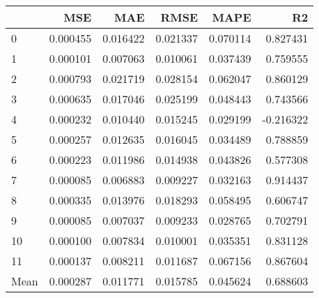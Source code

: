 \begin{tabular}{lrrrrr}
\toprule
 & MSE & MAE & RMSE & MAPE & R2 \\
\midrule
0 & 0.000455 & 0.016422 & 0.021337 & 0.070114 & 0.827431 \\
1 & 0.000101 & 0.007063 & 0.010061 & 0.037439 & 0.759555 \\
2 & 0.000793 & 0.021719 & 0.028154 & 0.062047 & 0.860129 \\
3 & 0.000635 & 0.017046 & 0.025199 & 0.048443 & 0.743566 \\
4 & 0.000232 & 0.010440 & 0.015245 & 0.029199 & -0.216322 \\
5 & 0.000257 & 0.012635 & 0.016045 & 0.034489 & 0.788859 \\
6 & 0.000223 & 0.011986 & 0.014938 & 0.043826 & 0.577308 \\
7 & 0.000085 & 0.006883 & 0.009227 & 0.032163 & 0.914437 \\
8 & 0.000335 & 0.013976 & 0.018293 & 0.058495 & 0.606747 \\
9 & 0.000085 & 0.007037 & 0.009233 & 0.028765 & 0.702791 \\
10 & 0.000100 & 0.007834 & 0.010001 & 0.035351 & 0.831128 \\
11 & 0.000137 & 0.008211 & 0.011687 & 0.067156 & 0.867604 \\
Mean & 0.000287 & 0.011771 & 0.015785 & 0.045624 & 0.688603 \\
\bottomrule
\end{tabular}
